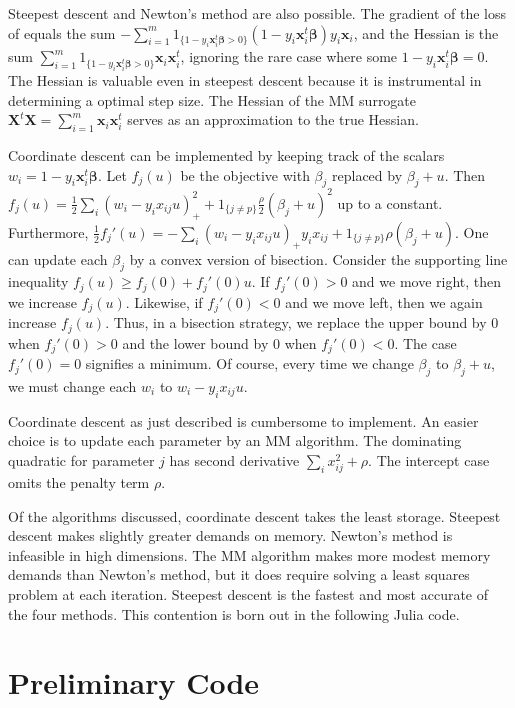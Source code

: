 \documentclass[11pt]{article}
\newcommand{\bx}{\boldsymbol{x}}
\newcommand{\bX}{\boldsymbol{X}}
\newcommand{\bbeta}{\boldsymbol{\beta}}
\begin{document}
Steepest descent and Newton's method are also possible. The gradient of the loss of equals the sum $-\sum_{i=1}^m 1_{\{1-y_i\bx_i^t\bbeta > 0\}}(1-y_i\bx_i^t\bbeta)y_i\bx_i$, and the Hessian is the sum $\sum_{i=1}^m 1_{\{1-y_i\bx_i^t\bbeta > 0\}}\bx_i\bx_i^t$, ignoring the rare case where some $1-y_i\bx_i^t\bbeta = 0$. The Hessian is valuable even in steepest descent because it is instrumental in determining a optimal step size.
The Hessian of the MM surrogate $\bX^t\bX= \sum_{i=1}^m \bx_i\bx_i^t$ serves as an approximation to the true Hessian. 
 
Coordinate descent can be implemented by keeping track of the scalars $w_i = 1-y_i\bx_i^t\bbeta$. Let $f_j(u)$ be the objective with $\beta_j$ replaced by $\beta_j+u$. Then $f_j(u)=\frac{1}{2}\sum_i (w_i-y_ix_{ij}u)_+^2+1_{\{j \ne p\}}\frac{\rho}{2}(\beta_j+u)^2$ up to a constant. Furthermore, $\frac{1}{2}f_j'(u)=-\sum_i (w_i-y_ix_{ij}u)_+y_ix_{ij}+1_{\{j \ne p\}}\rho(\beta_j+u)$. One can update each $\beta_j$ by a convex version of bisection. Consider the supporting line inequality $f_j(u)\ge f_j(0)+f_j'(0)u$. If $f_j'(0)>0$ and we move right, then we increase $f_j(u)$. Likewise, if $f_j'(0)<0$ and we move left, then we again increase $f_j(u)$. Thus, in a bisection strategy, we replace the upper bound by $0$ when $f_j'(0)>0$ and the lower bound by $0$ when $f_j'(0)<0$. The case $f_j'(0)=0$ signifies a minimum. Of course, every time we change $\beta_j$ to $\beta_j+u$, we must change each $w_i$ to $w_i-y_ix_{ij}u$.

Coordinate descent as just described is cumbersome to implement. An easier choice
is to update each parameter by an MM algorithm. The dominating quadratic for
parameter $j$ has second derivative $\sum_i x_{ij}^2 +\rho$. The intercept case omits the penalty term $\rho$. 

Of the algorithms discussed, coordinate descent takes the least storage. Steepest descent makes slightly greater demands on memory. Newton's method is infeasible in high dimensions. The MM algorithm makes more modest memory demands than Newton's method, but it does require solving a least squares problem at each iteration.  Steepest descent is the fastest and most accurate of the four methods. This contention is born out in the following Julia code.

\section*{\center Preliminary Code}
\end{document}
